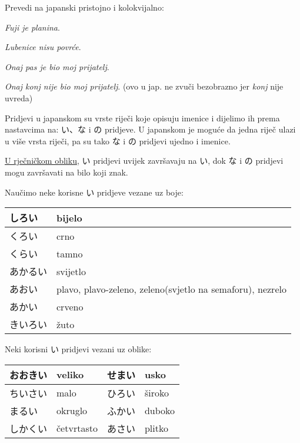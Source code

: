 	\begin{mondai}{\ten Prevedi na japanski pristojno i kolokvijalno:}
		\item \textit{Fuji je planina}.
		\item \textit{Lubenice nisu povrće}.
		\item \textit{Onaj pas je bio moj prijatelj}.
		\item \textit{Onaj konj nije bio moj prijatelj}. (ovo u jap. ne zvuči bezobrazno jer \textit{konj} nije uvreda)
	\end{mondai}
	
\newpage
{}


	
	Pridjevi u japanskom su vrste riječi koje opisuju imenice i dijelimo ih prema nastavcima na: い、な i の pridjeve. U japanskom je moguće da jedna riječ ulazi u više vrsta riječi, pa su tako な i の pridjevi ujedno i imenice.
	
\underline{U rječničkom obliku}, い pridjevi uvijek završavaju na い, dok な i の pridjevi mogu završavati na bilo koji znak.



Naučimo neke korisne い pridjeve vezane uz boje:

	\vspace{10pt}
	\begin{tabular}{|l|l|}
		\hline
		しろい&bijelo\\\hline
		くろい&crno\\\hline
		くらい&tamno\\\hline
		あかるい&svijetlo\\\hline
		あおい&plavo, plavo-zeleno, zeleno(svjetlo na semaforu), nezrelo\\\hline
		あかい&crveno\\\hline
		きいろい&žuto\\\hline
	\end{tabular}
	
\vspace{10pt}
Neki korisni い pridjevi vezani uz oblike:
	
	\vspace{10pt}
	\begin{tabular}{|l|l|l|l|}
		\hline
		おおきい&veliko&せまい&usko\\\hline
		ちいさい&malo&ひろい&široko\\\hline
		まるい&okruglo&ふかい&duboko\\\hline
		しかくい&četvrtasto&あさい&plitko\\\hline
	\end{tabular}
	
